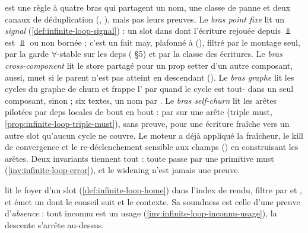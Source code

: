 \begin{resume}
 est une règle à quatre bras qui partagent un nom, une classe de panne et deux canaux de déduplication (, ), mais pas leurs preuves. Le \emph{bras point fixe} lit un \emph{signal} (\cref{def:infinite-loop-signal}) : un slot dans  dont l'écriture rejouée depuis $\Bot$ est $\Bot$ ou non bornée ; c'est un fait may, plafonné à \Warning{} (), filtré par le montage seul, par la garde $\forall$-stable sur les deps ( §5) et par la classe  des écritures. Le \emph{bras cross-component} lit le store partagé pour un prop setter d'un autre composant, \Warning{} aussi, muet si le parent n'est pas atteint en descendant (). Le \emph{bras graphe} lit les cycles du graphe de churn et frappe l'\Error{} par  quand le cycle est tout- dans un seul composant, \Warning{} sinon ; six textes, un nom par . Le \emph{bras self-churn} lit les arêtes pilotées par deps locales de bout en bout : \Error{} par  sur une arête  (triple must, \cref{prop:infinite-loop-triple-must}), \Warning{} sans preuve, \Info{} pour une écriture fraîche vers un autre slot qu'aucun cycle ne couvre. Le moteur a déjà appliqué la fraîcheur, le kill de convergence et le re-déclenchement sensible aux champs () en construisant les arêtes. Deux invariants tiennent tout : toute \Error{} passe par une primitive must (\cref{inv:infinite-loop-error}), et le widening n'est jamais une preuve.

 lit le foyer d'un slot (\cref{def:infinite-loop-home}) dans l'index de rendu, filtre par  et , et émet un \Warning{} dont le conseil suit  et le contexte. Sa soundness est celle d'une preuve d'\emph{absence} : tout inconnu est un usage (\cref{inv:infinite-loop-inconnu-usage}), la descente s'arrête au-dessus.


\end{resume}

